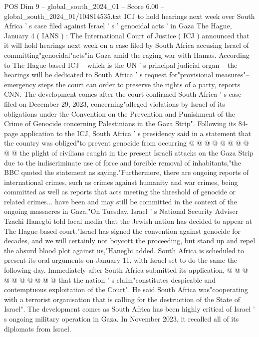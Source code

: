 \begin{textsample}{POS Dim 9 – global\_south\_2024\_01 – Score 6.00 – global\_south\_2024\_01/104814535.txt}  \label{ex:f9_pos_065}
ICJ to hold hearings next week over South Africa ' s case filed against Israel ' s ' genocidal acts ' in Gaza The Hague, January 4 ( IANS ) : The International Court of Justice ( ICJ ) announced that it will hold hearings next week on a case filed by South Africa accusing Israel of committing"genocidal"acts"in Gaza amid the raging war with Hamas.
According to The Hague-based ICJ -- which is the UN ' s principal judicial organ -- the hearings will be dedicated to South Africa ' s request for"provisional measures"-- emergency steps the court can order to preserve the rights of a party, reports CNN.
The development comes after the court confirmed South Africa ' s case filed on December 29, 2023, concerning"alleged violations by Israel of its obligations under the Convention on the Prevention and Punishment of the Crime of Genocide concerning Palestinians in the Gaza Strip".
Following its 84-page application to the ICJ, South Africa ' s presidency said in a statement that the country was obliged"to prevent genocide from occurring @ @ @ @ @ @ @ @ @ @ the plight of civilians caught in the present Israeli attacks on the Gaza Strip due to the indiscriminate use of force and forcible removal of inhabitants,"the BBC quoted the statement as saying."Furthermore, there are ongoing reports of international crimes, such as crimes against humanity and war crimes, being committed as well as reports that acts meeting the threshold of genocide or related crimes... have been and may still be committed in the context of the ongoing massacres in Gaza."On Tuesday, Israel ' s National Security Adviser Tzachi Hanegbi told local media that the Jewish nation has decided to appear at The Hague-based court."Israel has signed the convention against genocide for decades, and we will certainly not boycott the proceeding, but stand up and repel the absurd blood plot against us,"Hanegbi added.
South Africa is scheduled to present its oral arguments on January 11, with Israel set to do the same the following day.
Immediately after South Africa submitted its application, @ @ @ @ @ @ @ @ @ @ that the nation ' s claim"constitutes despicable and contemptuous exploitation of the Court".
He said South Africa was"cooperating with a terrorist organisation that is calling for the destruction of the State of Israel".
The development comes as South Africa has been highly critical of Israel ' s ongoing military operation in Gaza.
In November 2023, it recalled all of its diplomats from Israel.

\end{textsample}
